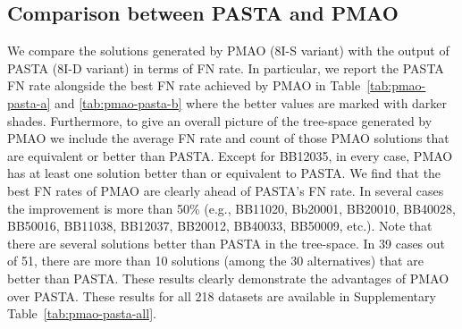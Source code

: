 \subsection{Comparison between PASTA and PMAO}
We compare the solutions generated by PMAO (8I-S variant) with the output of PASTA (8I-D variant) in terms of FN rate. In particular, we report the PASTA FN rate  alongside the best FN rate achieved by PMAO in Table~\ref{tab:pmao-pasta-a} and \ref{tab:pmao-pasta-b} where the better values are marked with darker shades. Furthermore, to give an overall picture of the tree-space generated by PMAO we include the average FN rate and count of those PMAO solutions that are equivalent or better than PASTA. Except for BB12035, in every case, PMAO has at least one solution better than or equivalent to PASTA. We find that the best FN rates of PMAO are clearly ahead of PASTA's FN rate. In several cases the improvement is more than 50\% (e.g., BB11020, Bb20001, BB20010, BB40028, BB50016, BB11038, BB12037, BB20012, BB40033, BB50009, etc.). Note that there are several solutions better than PASTA in the tree-space. In 39 cases out of 51, there are more than 10 solutions (among the 30 alternatives) that are better than PASTA. These results clearly demonstrate the advantages of PMAO over PASTA. These results for all 218 datasets are available in Supplementary Table~\ref{tab:pmao-pasta-all}.
